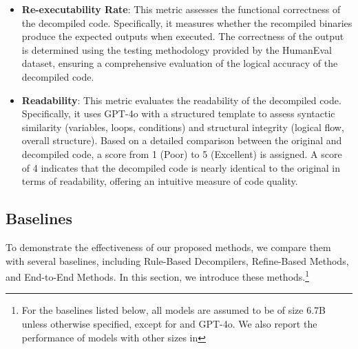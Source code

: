 \begin{itemize}
  \item \textbf{Re-executability Rate}: This metric assesses the functional correctness of the decompiled code. Specifically, it measures whether the recompiled binaries produce the expected outputs when executed. The correctness of the output is determined using the testing methodology provided by the HumanEval dataset, ensuring a comprehensive evaluation of the logical accuracy of the decompiled code.
  \item \textbf{Readability}: This metric evaluates the readability of the decompiled code. Specifically, it uses GPT-4o with a structured template to assess syntactic similarity (variables, loops, conditions) and structural integrity (logical flow, overall structure). Based on a detailed comparison between the original and decompiled code, a score from 1 (Poor) to 5 (Excellent) is assigned. A score of 4 indicates that the decompiled code is nearly identical to the original in terms of readability, offering an intuitive measure of code quality.
\end{itemize}





\subsection{Baselines}
\label{sec:baselines}


To demonstrate the effectiveness of our proposed methods, we compare them with several baselines, including Rule-Based Decompilers, Refine-Based Methods, and End-to-End Methods.
In this section, we introduce these methods.\footnote{For the baselines listed below, all models are assumed to be of size 6.7B unless otherwise specified, except for \ghidra{} and GPT-4o. We also report the performance of models with other sizes in }


